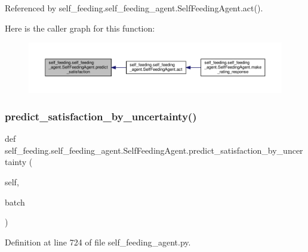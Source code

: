 Referenced by self\+\_\+feeding.\+self\+\_\+feeding\+\_\+agent.\+Self\+Feeding\+Agent.\+act().

Here is the caller graph for this function\+:
\nopagebreak
\begin{figure}[H]
\begin{center}
\leavevmode
\includegraphics[width=350pt]{classself__feeding_1_1self__feeding__agent_1_1SelfFeedingAgent_ab995d9cb7e699570a4179865ce7e09be_icgraph}
\end{center}
\end{figure}
\mbox{\label{classself__feeding_1_1self__feeding__agent_1_1SelfFeedingAgent_a9613b626ec2e4bbdeca8b1decc9d7513}} 
\subsubsection{\texorpdfstring{predict\+\_\+satisfaction\+\_\+by\+\_\+uncertainty()}{predict\_satisfaction\_by\_uncertainty()}}
{\footnotesize\ttfamily def self\+\_\+feeding.\+self\+\_\+feeding\+\_\+agent.\+Self\+Feeding\+Agent.\+predict\+\_\+satisfaction\+\_\+by\+\_\+uncertainty (\begin{DoxyParamCaption}\item[{}]{self,  }\item[{}]{batch }\end{DoxyParamCaption})}



Definition at line 724 of file self\+\_\+feeding\+\_\+agent.\+py.



